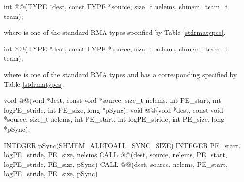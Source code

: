 
\begin{apidefinition}

{\color{Green}
\begin{C11synopsis}
int @@(TYPE *dest, const TYPE *source, size_t nelems, shmem_team_t team);
\end{C11synopsis}
where \TYPE{} is one of the standard \ac{RMA} types specified by Table
\ref{stdrmatypes}.
}

{\color{Green}
\begin{Csynopsis}
int @@(TYPE *dest, const TYPE *source, size_t nelems, shmem_team_t team);
\end{Csynopsis}
where \TYPE{} is one of the standard \ac{RMA} types and has a corresponding
\TYPENAME{} specified by Table \ref{stdrmatypes}.
}

\begin{DeprecateBlock}
\begin{CsynopsisCol}
void @@(void *dest, const void *source, size_t nelems, int PE_start, int logPE_stride, int PE_size, long *pSync);
void @@(void *dest, const void *source, size_t nelems, int PE_start, int logPE_stride, int PE_size, long *pSync);
\end{CsynopsisCol}
\end{DeprecateBlock}

\begin{Fsynopsis}
INTEGER pSync(SHMEM_ALLTOALL_SYNC_SIZE)
INTEGER PE_start, logPE_stride, PE_size, nelems
CALL @@(dest, source, nelems, PE_start, logPE_stride, PE_size, pSync)
CALL @@(dest, source, nelems, PE_start, logPE_stride, PE_size, pSync)
\end{Fsynopsis}

\begin{apiarguments}



\end{apiarguments}
\end{apidefinition}
